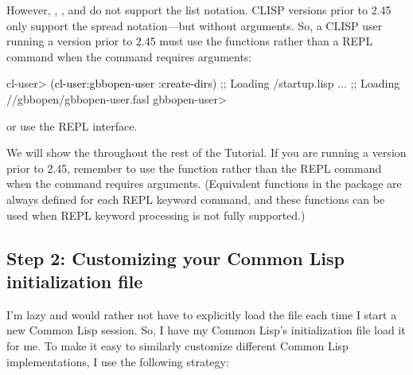 \documentclass[10pt,twoside,english,pdftex]{article}
\begin{document}
However, ,
, and
 do not support the list
notation.  CLISP versions prior to 2.45 only support the spread notation---but
without arguments.  So, a CLISP user running a version prior to 2.45 must use
the  functions rather than a REPL command when the
command requires arguments:
%
\W\supp
\begin{example}
\textcolor{darkergray}{%
  cl-user> \textcolor{black}{(cl-user:gbbopen-user :create-dirs)}
  ;; Loading /startup.lisp
     ...
  ;; Loading //gbbopen/gbbopen-user.fasl
  gbbopen-user>}
\end{example}
%
or use the  REPL
interface.

We will show the 
throughout the rest of the Tutorial.  If you are running a
 version prior to 2.45, remember to
use the  function rather than the REPL command when
the command requires arguments.  (Equivalent functions in the
 package are always defined for each REPL
keyword command, and these functions can be used when REPL keyword
processing is not fully supported.)

\subsection*{Step 2: Customizing your Common Lisp initialization file}

I'm lazy and would rather not have to explicitly load the
 file each time I start a new
Common Lisp session.  So, I have my Common Lisp's initialization file load it
for me.  To make it easy to similarly customize different Common Lisp
implementations, I use the following strategy:
\end{document}
